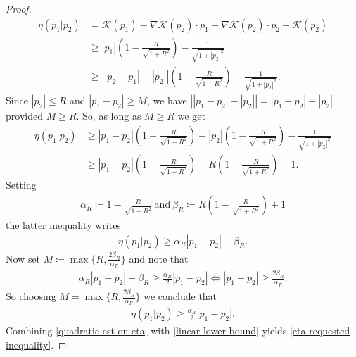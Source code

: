 \documentclass[11pt,reqno]{amsart}
\numberwithin{equation}{section}
\begin{document}
\begin{proof}
\begin{align*}
\eta(p_{1}\vert p_{2})&=
\mathscr{K}(p_{1})-\nabla \mathscr{K}(p_{2})\cdot p_{1}+\nabla \mathscr{K}(p_{2})\cdot p_{2}-\mathscr{K}(p_{2})\\
&\geq \left\vert p_{1}\right\vert\left(1-\frac{R}{\sqrt{1+R^{2}}}\right)-\frac{1}{\sqrt{1+\left\vert p_{2}\right\vert^{2}}}\\
&\geq \left\vert \left\vert p_{2}-p_{1}\right\vert-\left\vert p_{2}\right\vert\right\vert\left(1-\frac{R}{\sqrt{1+R^{2}}}\right)-\frac{1}{\sqrt{1+\left\vert p_{2}\right\vert^{2}}}. \end{align*}
Since $\left\vert p_{2}\right\vert\leq R $ and $\left\vert p_{1}-p_{2}\right\vert\geq M$, we have $\left\vert \left\vert p_{1}-p_{2}\right\vert -\left\vert p_{2}\right\vert \right\vert=\left\vert p_{1}-p_{2}\right\vert  -\left\vert p_{2}\right\vert $ provided $M\geq R$.  So, as long as $M\geq R$ we get 
\begin{align*}
\eta(p_{1}\vert p_{2})&\geq \left\vert p_{1}-p_{2}\right\vert\left(1-\frac{R}{\sqrt{1+R^{2}}}\right)-\left\vert p_{2}\right\vert\left(1-\frac{R}{\sqrt{1+R^{2}}}\right)-\frac{1}{\sqrt{1+\left\vert p_{2}\right\vert^{2}}}\\
&\geq \left\vert p_{1}-p_{2}\right\vert\left(1-\frac{R}{\sqrt{1+R^{2}}}\right)-R\left(1-\frac{R}{\sqrt{1+R^{2}}}\right)-1. 
\end{align*}
Setting 
\begin{align*}
\alpha_{R}\coloneqq 1-\frac{R}{\sqrt{1+R^{2}}}\ \mbox{and}\ \beta_{R}\coloneqq R\left(1-\frac{R}{\sqrt{1+R^{2}}}\right)+1    
\end{align*}
the latter inequality writes 
\begin{align*}
\eta(p_{1}\vert p_{2})\geq \alpha_{R}\left\vert p_{1}-p_{2}\right\vert-\beta_{R}.      
\end{align*}
Now set $M\coloneqq \max\{R,\frac{2\beta_{R}}{\alpha_{R}}\}$ and note that 
\begin{align*}
\alpha_{R}\left\vert p_{1}-p_{2}\right\vert-\beta_{R}\geq \frac{\alpha_{R}}{2}\left\vert p_{1}-p_{2}\right\vert\iff \left\vert p_{1}-p_{2}\right\vert\geq \frac{2\beta_{R}}{\alpha_{R}}.        
\end{align*}
So choosing  $M=\max\{R,\frac{2\beta_{R}}{\alpha_{R}}\}$ we conclude that 
\begin{align}
\eta(p_{1}\vert p_{2})\geq \frac{\alpha_{R}}{2}\left\vert p_{1}-p_{2}\right\vert. \label{linear lower bound}     
\end{align}
Combining \eqref{quadratic est on eta} with \eqref{linear lower bound} yields \eqref{eta requested inequality}. 
\end{proof}
\end{document}
